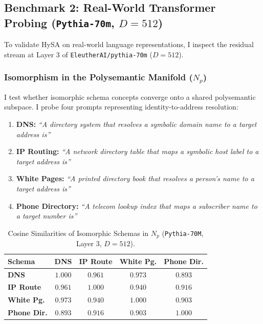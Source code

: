 \documentclass[10pt,twocolumn]{article}
\theoremstyle{definition}
\begin{document}
\subsection{Benchmark 2: Real-World Transformer Probing (\texorpdfstring{\texttt{Pythia-70m}}{Pythia-70m}, \texorpdfstring{$D=512$}{D=512})}
To validate HySA on real-world language representations, I inspect the residual stream at Layer 3 of \texttt{EleutherAI/pythia-70m} ($D=512$).

\subsubsection{Isomorphism in the Polysemantic Manifold \texorpdfstring{($N_p$)}{(Np)}}
I test whether isomorphic schema concepts converge onto a shared polysemantic subspace. I probe four prompts representing identity-to-address resolution:
\begin{enumerate}[leftmargin=*, itemsep=1.0pt]
    \item \textbf{DNS:} \textit{``A directory system that resolves a symbolic domain name to a target address is''}
    \item \textbf{IP Routing:} \textit{``A network directory table that maps a symbolic host label to a target address is''}
    \item \textbf{White Pages:} \textit{``A printed directory book that resolves a person's name to a target address is''}
    \item \textbf{Phone Directory:} \textit{``A telecom lookup index that maps a subscriber name to a target number is''}
\end{enumerate}

\begin{table}[t]
\centering
\caption{Cosine Similarities of Isomorphic Schemas in $N_p$ (\texttt{Pythia-70M}, Layer 3, $D=512$).}
\label{tab:pythia_cosine}
\vspace{0.12cm}
\scriptsize
\setlength{\tabcolsep}{2.5pt}
\begin{tabular}{@{}lcccc@{}}
\toprule
\textbf{Schema} & \textbf{DNS} & \textbf{IP Route} & \textbf{White Pg.} & \textbf{Phone Dir.} \\ \midrule
\textbf{DNS} & $1.000$ & $0.961$ & $0.973$ & $0.893$ \\
\textbf{IP Route} & $0.961$ & $1.000$ & $0.940$ & $0.916$ \\
\textbf{White Pg.} & $0.973$ & $0.940$ & $1.000$ & $0.903$ \\
\textbf{Phone Dir.} & $0.893$ & $0.916$ & $0.903$ & $1.000$ \\ \bottomrule
\end{tabular}
\end{table}
\end{document}

